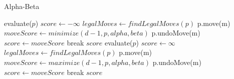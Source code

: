 \begin{algorithm}
    \caption{Alpha-Beta}
    \begin{algorithmic}[1]
        \State \Return evaluate($p$)
        \Else
        \State $score \gets -\infty$
        \State $legalMoves \gets findLegalMoves(p)$
        \State p.move(m)
        \State $moveScore \gets minimize(d-1, p, alpha, beta)$
        \State p.undoMove(m)
        \State $score \gets moveScore$
        \EndIf
        \State break
        \EndIf
        \EndFor
        \EndIf
        \State \Return $score$
        \EndFunction
        \State \Return evaluate($p$)
        \Else
        \State $score \gets \infty$
        \State $legalMoves \gets findLegalMoves(p)$
        \State p.move(m)
        \State $moveScore \gets maximize(d-1, p, alpha, beta)$
        \State p.undoMove(m)
        \State $score \gets moveScore$
        \EndIf
        \State break
        \EndIf
        \EndFor
        \EndIf
        \State \Return $score$
        \EndFunction
    \end{algorithmic}
\end{algorithm}
\newpage


